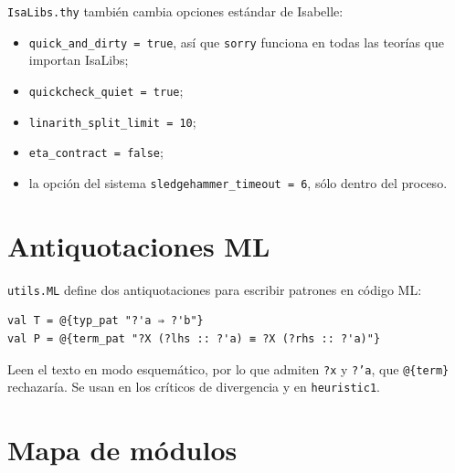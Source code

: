 \documentclass[11pt,a4paper]{article}
\newcommand{\isa}[1]{\texttt{#1}}
\theoremstyle{definition}
\theoremstyle{remark}
\begin{document}
\isa{IsaLibs.thy} también cambia opciones estándar de Isabelle:
\begin{itemize}[nosep]
  \item \isa{quick\_and\_dirty = true}, así que \isa{sorry} funciona en todas las
        teorías que importan IsaLibs;
  \item \isa{quickcheck\_quiet = true};
  \item \isa{linarith\_split\_limit = 10};
  \item \isa{eta\_contract = false};
  \item la opción del sistema \isa{sledgehammer\_timeout = 6}, sólo dentro del proceso.
\end{itemize}

\section{Antiquotaciones ML}

\isa{utils.ML} define dos antiquotaciones para escribir patrones en código ML:
\begin{lstlisting}
val T = @{typ_pat "?'a ⇒ ?'b"}
val P = @{term_pat "?X (?lhs :: ?'a) ≡ ?X (?rhs :: ?'a)"}
\end{lstlisting}
Leen el texto en modo esquemático, por lo que admiten \isa{?x} y \isa{?'a}, que
\isa{@\{term\}} rechazaría. Se usan en los críticos de divergencia y en
\isa{heuristic1}.

\section{Mapa de módulos}
\end{document}

